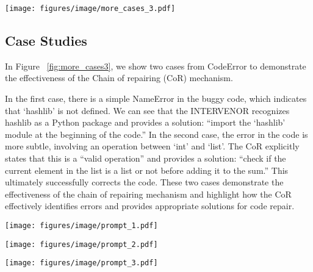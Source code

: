 \documentclass[11pt]{article}
\begin{document}
\begin{figure*}[h] \centering
    \texttt{[image: figures/image/more\_cases\_3.pdf]}
    \caption{Case Studies. We present two cases from CodeError. The chain of repairing clearly identifies the errors in the buggy code and provides the correct modification methods, which are highlighted in \textcolor{red}{\textbf{red}}.} \label{fig:more_cases3}
\end{figure*}

 \subsection{Case Studies}\label{app:more_cases}
In Figure ~\ref{fig:more_cases3}, we show two cases from CodeError to demonstrate the effectiveness of the Chain of repairing (CoR) mechanism.

In the first case, there is a simple NameError in the buggy code, which indicates that `hashlib' is not defined. We can see that the INTERVENOR recognizes hashlib as a Python package and provides a solution: ``import the `hashlib' module at the beginning of the code.'' In the second case, the error in the code is more subtle, involving an operation between `int' and `list'. The CoR explicitly states that this is a ``valid operation'' and provides a solution: ``check if the current element in the list is a list or not before adding it to the sum.'' This ultimately successfully corrects the code. These two cases demonstrate the effectiveness of the chain of repairing mechanism and highlight how the CoR effectively identifies errors and provides appropriate solutions for code repair.


\begin{figure*}[h] \centering
    \texttt{[image: figures/image/prompt\_1.pdf]}
    \caption{Role Instructions in INTERVENOR. Within INTERVENOR, there are two LLM-based agents \textit{Code Teacher} and \textit{Code Learner}. We utilize specific instructions to ensure that they play the correct roles and carry out the intended tasks.} \label{fig:prompt}
\end{figure*}
 \begin{figure*}[h] \centering
    \texttt{[image: figures/image/prompt\_2.pdf]}
    \caption{Zero-Shot, Zero-Shot CoT, and Few-Shot prompts for code generation tasks.} \label{fig:prompt_2}
\end{figure*}

\begin{figure*}[h] \centering
    \texttt{[image: figures/image/prompt\_3.pdf]}
    \caption{Few-Shot CoT prompts for code generation tasks.} \label{fig:prompt_3}
\end{figure*}
\end{document}
